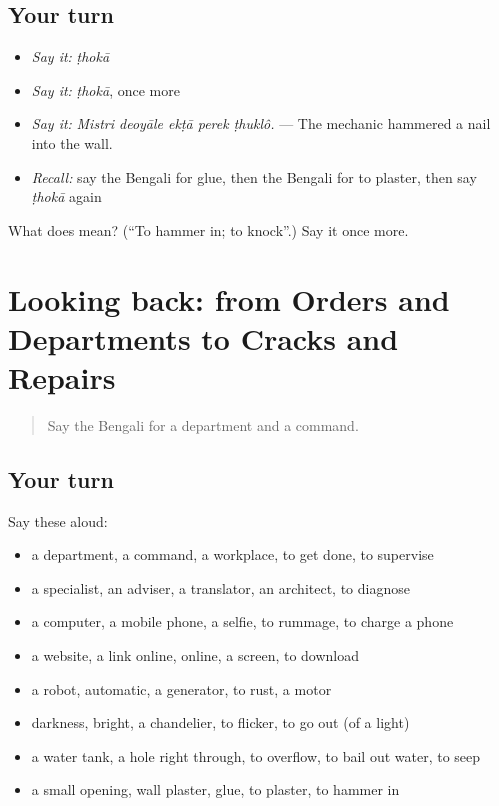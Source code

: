 \subsection*{Your turn}
\begin{itemize}
\raggedright
  \item \emph{Say it:} \emph{ṭhokā}
  \item \emph{Say it:} \emph{ṭhokā}, once more
  \item \emph{Say it:} \emph{Mistri deoyāle ekṭā perek ṭhuklô.} — The mechanic hammered a nail into the wall.
  \item \emph{Recall:} say the Bengali for glue, then the Bengali for to plaster, then say \emph{ṭhokā} again
\end{itemize}

\begin{tcolorbox}[breakable,colback=teal!4,colframe=teal!35!black,title={Before you move on}]
What does  mean? (\textquotedblleft{}To hammer in; to knock\textquotedblright{}.) Say it once more.
\end{tcolorbox}
\section[(dialogue)]{Looking back: from Orders and Departments to Cracks and Repairs}

\label{lesson:BN-R507-review-500-507}



\begin{quote}
Say the Bengali for a department and a command.
\end{quote}

\subsection*{Your turn}
Say these aloud:

\begin{itemize}
\raggedright
  \item a department, a command, a workplace, to get done, to supervise
  \item a specialist, an adviser, a translator, an architect, to diagnose
  \item a computer, a mobile phone, a selfie, to rummage, to charge a phone
  \item a website, a link online, online, a screen, to download
  \item a robot, automatic, a generator, to rust, a motor
  \item darkness, bright, a chandelier, to flicker, to go out (of a light)
  \item a water tank, a hole right through, to overflow, to bail out water, to seep
  \item a small opening, wall plaster, glue, to plaster, to hammer in
\end{itemize}


